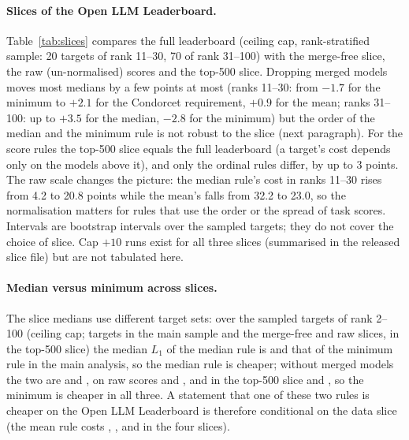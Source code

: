 \paragraph{Slices of the Open LLM Leaderboard.} Table~\ref{tab:slices} compares the full leaderboard (ceiling cap, rank-stratified sample: 20 targets of rank 11--30, 70 of rank 31--100) with the merge-free slice, the raw (un-normalised) scores and the top-500 slice. Dropping merged models moves most medians by a few points at most (ranks 11--30: from $-1.7$ for the minimum to $+2.1$ for the Condorcet requirement, $+0.9$ for the mean; ranks 31--100: up to $+3.5$ for the median, $-2.8$ for the minimum) but the order of the median and the minimum rule is not robust to the slice (next paragraph). For the score rules the top-500 slice equals the full leaderboard (a target's cost depends only on the models above it), and only the ordinal rules differ, by up to 3 points. The raw scale changes the picture: the median rule's cost in ranks 11--30 rises from 4.2 to 20.8 points while the mean's falls from 32.2 to 23.0, so the normalisation matters for rules that use the order or the spread of task scores. Intervals are bootstrap intervals over the sampled targets; they do not cover the choice of slice. Cap $+10$ runs exist for all three slices (summarised in the released slice file) but are not tabulated here.

\paragraph{Median versus minimum across slices.} The slice medians use different target sets: over the sampled targets of rank 2--100 (ceiling cap; \sliceNMain{} targets in the main sample and the merge-free and raw slices, \sliceNTop{} in the top-500 slice) the median $L_1$ of the median rule is \sliceLMainMedian{} and that of the minimum rule \sliceLMainMin{} in the main analysis, so the median rule is cheaper; without merged models the two are \sliceLNomergeMedian{} and \sliceLNomergeMin{}, on raw scores \sliceLRawMedian{} and \sliceLRawMin{}, and in the top-500 slice \sliceLTopMedian{} and \sliceLTopMin{}, so the minimum is cheaper in all three. A statement that one of these two rules is cheaper on the Open LLM Leaderboard is therefore conditional on the data slice (the mean rule costs \sliceLMainMean, \sliceLNomergeMean, \sliceLRawMean{} and \sliceLTopMean{} in the four slices).

\begin{table}[h]
\caption{Open LLM Leaderboard slices, rank bin 11--30, ceiling cap: median $K$ and $L_1$ by rule.}
\label{tab:slices}
\centering\scriptsize
\resizebox{\linewidth}{!}{}
\end{table}

